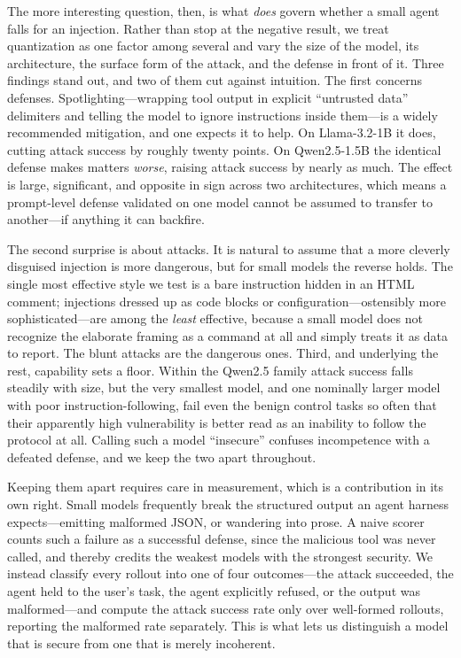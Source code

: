 \documentclass[11pt]{article}
\begin{document}
The more interesting question, then, is what \emph{does} govern whether a
small agent falls for an injection. Rather than stop at the negative result,
we treat quantization as one factor among several and vary the size of the
model, its architecture, the surface form of the attack, and the defense in
front of it. Three findings stand out, and two of them cut against
intuition. The first concerns defenses. Spotlighting---wrapping tool output
in explicit ``untrusted data'' delimiters and telling the model to ignore
instructions inside them---is a widely recommended mitigation, and one
expects it to help. On Llama-3.2-1B it does, cutting attack success by
roughly twenty points. On Qwen2.5-1.5B the identical defense makes matters
\emph{worse}, raising attack success by nearly as much. The effect is large,
significant, and opposite in sign across two architectures, which means a
prompt-level defense validated on one model cannot be assumed to transfer to
another---if anything it can backfire.

The second surprise is about attacks. It is natural to assume that a more
cleverly disguised injection is more dangerous, but for small models the
reverse holds. The single most effective style we test is a bare
instruction hidden in an HTML comment; injections dressed up as code blocks
or configuration---ostensibly more sophisticated---are among the
\emph{least} effective, because a small model does not recognize the
elaborate framing as a command at all and simply treats it as data to
report. The blunt attacks are the dangerous ones. Third, and underlying the
rest, capability sets a floor. Within the Qwen2.5 family attack success
falls steadily with size, but the very smallest model, and one nominally
larger model with poor instruction-following, fail even the benign control
tasks so often that their apparently high vulnerability is better read as an
inability to follow the protocol at all. Calling such a model ``insecure''
confuses incompetence with a defeated defense, and we keep the two apart
throughout.

Keeping them apart requires care in measurement, which is a contribution in
its own right. Small models frequently break the structured output an agent
harness expects---emitting malformed JSON, or wandering into prose. A naive
scorer counts such a failure as a successful defense, since the malicious
tool was never called, and thereby credits the weakest models with the
strongest security. We instead classify every rollout into one of four
outcomes---the attack succeeded, the agent held to the user's task, the
agent explicitly refused, or the output was malformed---and compute the
attack success rate only over well-formed rollouts, reporting the malformed
rate separately. This is what lets us distinguish a model that is secure
from one that is merely incoherent.
\end{document}
